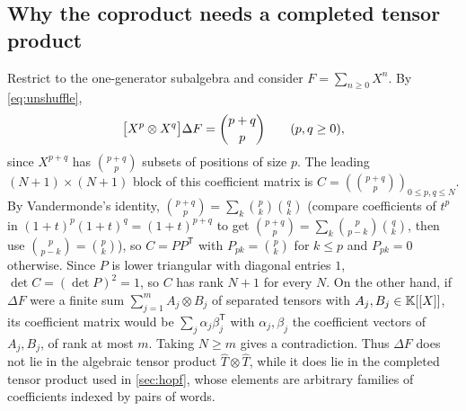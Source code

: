 \subsection{Why the coproduct needs a completed tensor product}
Restrict to the one-generator subalgebra and consider
$F=\sum_{n\geq0}X^n$. By \eqref{eq:unshuffle},
\[
 \bigl[X^p\otimes X^q\bigr]\Delta F=\binom{p+q}{p}\qquad(p,q\geq0),
\]
since $X^{p+q}$ has $\binom{p+q}p$ subsets of positions of size $p$. The
leading $(N+1)\times(N+1)$ block of this coefficient matrix is
$C=(\binom{p+q}p)_{0\leq p,q\leq N}$. By Vandermonde's identity,
$\binom{p+q}p=\sum_k\binom pk\binom qk$ (compare coefficients of $t^p$ in
$(1+t)^p(1+t)^q=(1+t)^{p+q}$ to get $\binom{p+q}p=\sum_k\binom p{p-k}\binom qk$,
then use $\binom p{p-k}=\binom pk$), so $C=PP^{\mathsf T}$ with $P_{pk}=\binom pk$ for $k\leq p$ and
$P_{pk}=0$ otherwise. Since $P$ is lower triangular with diagonal entries
$1$, $\det C=(\det P)^2=1$, so $C$ has rank $N+1$ for every $N$. On the
other hand, if $\Delta F$ were a finite sum $\sum_{j=1}^mA_j\otimes B_j$ of
separated tensors with $A_j,B_j\in\mathbb{K}[[X]]$, its coefficient matrix would
be $\sum_j\alpha_j\beta_j^{\mathsf T}$ with $\alpha_j,\beta_j$ the
coefficient vectors of $A_j,B_j$, of rank at most $m$. Taking $N\geq m$
gives a contradiction. Thus $\Delta F$ does not lie in the algebraic tensor
product $\widehat T\otimes\widehat T$, while it does lie in the completed
tensor product used in \cref{sec:hopf}, whose elements are arbitrary
families of coefficients indexed by pairs of words.
